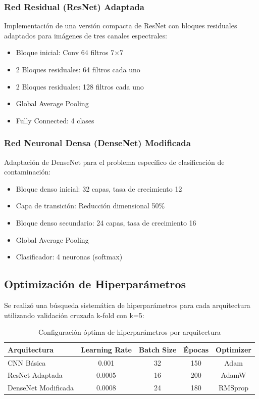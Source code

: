 \subsubsection{Red Residual (ResNet) Adaptada}

Implementación de una versión compacta de ResNet con bloques residuales adaptados para imágenes de tres canales espectrales:
\begin{itemize}
    \item Bloque inicial: Conv 64 filtros 7×7
    \item 2 Bloques residuales: 64 filtros cada uno
    \item 2 Bloques residuales: 128 filtros cada uno  
    \item Global Average Pooling
    \item Fully Connected: 4 clases
\end{itemize}

\subsubsection{Red Neuronal Densa (DenseNet) Modificada}

Adaptación de DenseNet para el problema específico de clasificación de contaminación:
\begin{itemize}
    \item Bloque denso inicial: 32 capas, tasa de crecimiento 12
    \item Capa de transición: Reducción dimensional 50\%
    \item Bloque denso secundario: 24 capas, tasa de crecimiento 16
    \item Global Average Pooling
    \item Clasificador: 4 neuronas (softmax)
\end{itemize}

\subsection{Optimización de Hiperparámetros}

Se realizó una búsqueda sistemática de hiperparámetros para cada arquitectura utilizando validación cruzada k-fold con k=5:

\begin{table}[h!]
\centering
\caption{Configuración óptima de hiperparámetros por arquitectura}
\begin{tabular}{|l|c|c|c|c|}
\hline
\textbf{Arquitectura} & \textbf{Learning Rate} & \textbf{Batch Size} & \textbf{Épocas} & \textbf{Optimizer} \\
\hline
CNN Básica & 0.001 & 32 & 150 & Adam \\
\hline
ResNet Adaptada & 0.0005 & 16 & 200 & AdamW \\
\hline
DenseNet Modificada & 0.0008 & 24 & 180 & RMSprop \\
\hline
\end{tabular}
\label{tab:hyperparameter_optimization}
\end{table}


